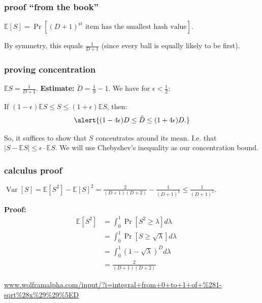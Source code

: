 \documentclass[handout,compress]{beamer}
\newcommand{\E}{\mathbb{E}}
\DeclareMathOperator{\Var}{Var}
\begin{document}
\begin{frame}
	\frametitle{proof ``from the book''}
	$\E[S] = \Pr[(D+1)^\text{st} \text{ item has the smallest hash value}]$.
	\begin{center}
	\end{center}
	By symmetry, this equals $\frac{1}{D+1}$ (since every ball is equally likely to be first). 
	
\end{frame}


\begin{frame}
	\frametitle{proving concentration}	
	$\E S = \frac{1}{D + 1}$. \textbf{Estimate:} $\tilde{D} = \frac{1}{S} - 1$. We have for $\epsilon < \frac{1}{2}$:
	
	\begin{center}
	If $(1-\epsilon)\E S \leq S \leq (1+\epsilon)\E S$, then:
	\begin{align*}
	\alert{(1-4\epsilon)D \leq \tilde{D} \leq (1+4\epsilon)D.}
	\end{align*}
	\end{center}
\vspace{10em}

	So, it suffices to show that $S$ concentrates around its mean. I.e. that $|S - \E S| \leq \epsilon\cdot\E S$. We will use Chebyshev's inequality as our concentration bound.
\end{frame}

\begin{frame}
	\frametitle{calculus proof}	
	\begin{lemma}
	$\Var[S] = \E [S^2] - \E[S]^2= \frac{2}{(D+1)(D+2)} - \frac{1}{(D+1)^2} \leq \frac{1}{(D+1)^2}$.
	\end{lemma}
	\textbf{Proof:} 
	\begin{align*}
	\E[S^2] &= \int_0^1 \Pr[S^2 \geq \lambda] d\lambda & &\text{} \\
	&= \int_0^1 \Pr[S \geq \sqrt{\lambda}] d\lambda & &\text{} \\
	&= \int_0^1 (1-\sqrt{\lambda})^D d\lambda & &\text{} \\
	& = \frac{2}{(D+1)(D+2)}& &\text{}
	\end{align*}
	
	\small
	\url{www.wolframalpha.com/input/?i=integral+from+0+to+1+of+\%281-sqrt\%28x\%29\%29\%5ED}
\end{frame}
\end{document}
